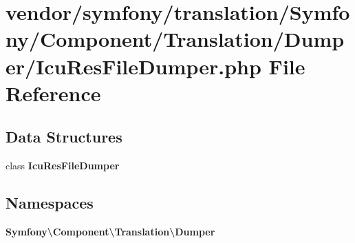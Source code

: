 \section{vendor/symfony/translation/\+Symfony/\+Component/\+Translation/\+Dumper/\+Icu\+Res\+File\+Dumper.php File Reference}
\label{_icu_res_file_dumper_8php}
\subsection*{Data Structures}
\begin{DoxyCompactItemize}
\item 
class {\bf Icu\+Res\+File\+Dumper}
\end{DoxyCompactItemize}
\subsection*{Namespaces}
\begin{DoxyCompactItemize}
\item 
 {\bf Symfony\textbackslash{}\+Component\textbackslash{}\+Translation\textbackslash{}\+Dumper}
\end{DoxyCompactItemize}
